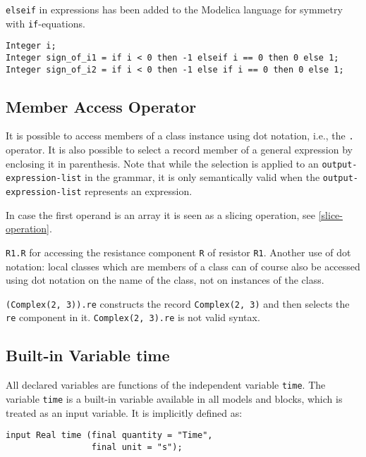 \begin{nonnormative}
\lstinline!elseif! in expressions has been added to the Modelica language for symmetry with \lstinline!if!-equations.
\end{nonnormative}

\begin{example}
\begin{lstlisting}[language=modelica]
Integer i;
Integer sign_of_i1 = if i < 0 then -1 elseif i == 0 then 0 else 1;
Integer sign_of_i2 = if i < 0 then -1 else if i == 0 then 0 else 1;
\end{lstlisting}
\end{example}

\subsection{Member Access Operator}\label{member-access-operator}

It is possible to access members of a class instance using dot notation, i.e., the \lstinline!.! operator.
It is also possible to select a record member of a general expression by enclosing it in parenthesis.
Note that while the selection is applied to an \lstinline[language=grammar]!output-expression-list! in the grammar, it is only semantically valid when the \lstinline[language=grammar]!output-expression-list! represents an expression.

In case the first operand is an array it is seen as a slicing operation, see \cref{slice-operation}.

\begin{example}
\lstinline!R1.R! for accessing the resistance component \lstinline!R! of resistor \lstinline!R1!.
Another use of dot notation: local classes which are members of a class can of course also be accessed using dot notation on the name of the class, not on instances of the class.

\lstinline!(Complex(2, 3)).re! constructs the record \lstinline!Complex(2, 3)! and then selects the \lstinline!re! component in it.
\lstinline!Complex(2, 3).re! is not valid syntax.
\end{example}

\subsection{Built-in Variable time}\label{built-in-variable-time}

All declared variables are functions of the independent variable \lstinline!time!.
The variable \lstinline!time! is a built-in variable available in all models and blocks, which is treated as an input variable.
It is implicitly defined as:
\begin{lstlisting}[language=modelica]
input Real time (final quantity = "Time",
                 final unit = "s");
\end{lstlisting}


